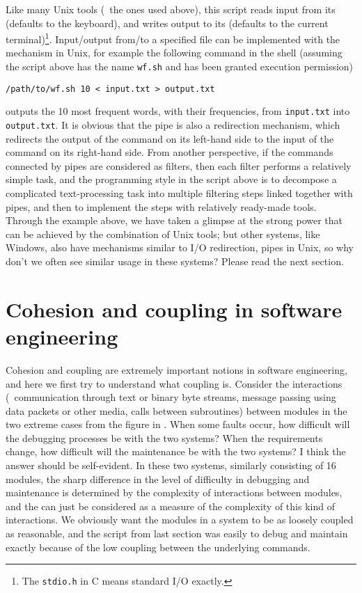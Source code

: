 Like many Unix tools (\eg~the ones used above), this script reads input from
its  (defaults to the keyboard), and writes output to
its  (defaults to the current terminal)\footnote{The
\texttt{stdio.h} in C means standard I/O exactly.}.  Input/output from/to a
specified file can be implemented with the  mechanism
in Unix, for example the following command in the shell (assuming the script
above has the name \verb|wf.sh| and has been granted execution permission)
\begin{quoting}
\begin{Verbatim}
/path/to/wf.sh 10 < input.txt > output.txt
\end{Verbatim}
\end{quoting}
outputs the 10 most frequent words, with their frequencies, from
\verb|input.txt| into \verb|output.txt|.  It is obvious that the pipe is also
a redirection mechanism, which redirects the output of the command on its
left-hand side to the input of the command on its right-hand side.  From another
perspective, if the commands connected by pipes are considered as filters, then
each filter performs a relatively simple task, and the programming style in the
script above is to decompose a complicated text-processing task into multiple
filtering steps linked together with pipes, and then to implement the steps
with relatively ready-made tools.  Through the example above, we have taken a
glimpse at the strong power that can be achieved by the combination of Unix
tools; but other systems, like Windows, also have mechanisms similar to I/O
redirection, pipes \etc{} in Unix, so why don't we often see similar
usage in these systems?  Please read the next section.

\section{Cohesion and coupling in software engineering}\label{sec:coupling}

Cohesion and coupling are extremely important notions in software engineering,
and here we first try to understand what coupling is.  Consider the interactions
(\eg~communication through text or binary byte streams, message passing using
data packets or other media, calls between subroutines) between modules in
the two extreme cases from the figure in \parencite{litt2014a}.  When some
faults occur, how difficult will the debugging processes be with the two
systems?  When the requirements change, how difficult will the maintenance be
with the two systems?  I think the answer should be self-evident.  In these two
systems, similarly consisting of 16 modules, the sharp difference in the level
of difficulty in debugging and maintenance is determined by the complexity
of interactions between modules, and the  can just
be considered as a measure of the complexity of this kind of interactions.
We obviously want the modules in a system to be as loosely coupled as
reasonable, and the script from last section was easily to debug and
maintain exactly because of the low coupling between the underlying commands.

